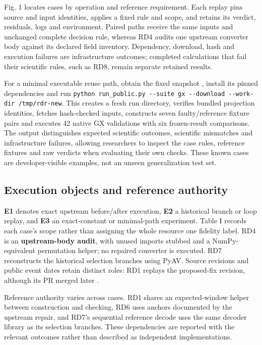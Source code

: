 \documentclass[conference]{IEEEtran}
\begin{document}
Fig. 1 locates cases by operation and reference requirement. Each replay pins source and input identities, applies a fixed rule and scope, and retains its verdict, residuals, logs and environment. Paired paths receive the same inputs and unchanged complete decision rule, whereas RD4 audits one upstream converter body against its declared field inventory. Dependency, download, hash and execution failures are infrastructure outcomes; completed calculations that fail their scientific rules, such as RD8, remain separate retained results.\par

For a minimal executable reuse path, obtain the fixed snapshot \cite{13}, install its pinned dependencies and run \texttt{python run\_\allowbreak{}\allowbreak{}public.py -{}-suite gx -{}-download -{}-work-dir /\allowbreak{}tmp/\allowbreak{}rdr-new}. This creates a fresh run directory, verifies bundled projection identities, fetches hash-checked inputs, constructs seven faulty/reference fixture pairs and executes 42 native GX validations with six frozen-result comparisons. The output distinguishes expected scientific outcomes, scientific mismatches and infrastructure failures, allowing researchers to inspect the case rules, reference fixtures and raw verdicts when evaluating their own checks. These known cases are developer-visible examples, not an unseen generalization test set.\par

\subsection{Execution objects and reference authority}

\textbf{E1} denotes exact upstream before/after execution, \textbf{E2} a historical branch or loop replay, and \textbf{E3} an exact-constant or minimal-path experiment. Table I records each case's scope rather than assigning the whole resource one fidelity label. RD4 is an \textbf{upstream-body audit}, with unused imports stubbed and a NumPy-equivalent permutation helper; no repaired converter is executed. RD7 reconstructs the historical selection branches using PyAV. Source revisions and public event dates retain distinct roles: RD1 replays the proposed-fix revision, although its PR merged later \cite{2}.\par

Reference authority varies across cases. RD1 shares an expected-window helper between construction and checking, RD6 uses anchors documented by the upstream repair, and RD7's sequential reference decode uses the same decoder library as its selection branches. These dependencies are reported with the relevant outcomes rather than described as independent implementations.\par
\end{document}
